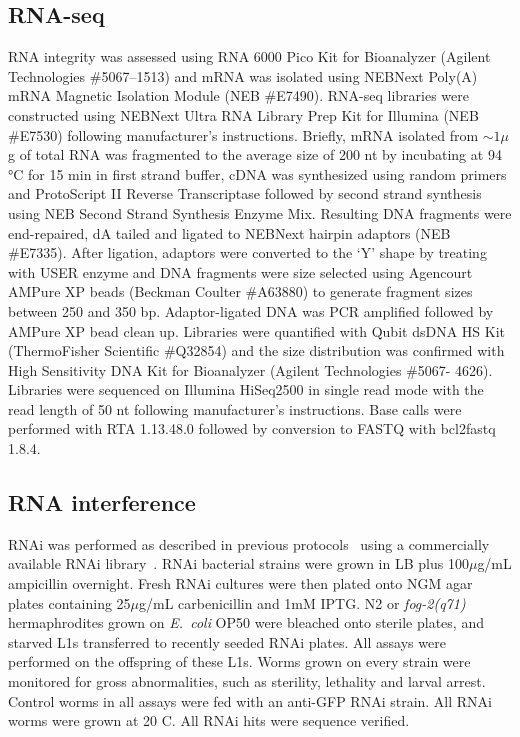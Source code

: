 \documentclass[9pt,twocolumn,twoside]{gsag3jnl}
\newcommand{\fog}{\emph{fog-2}}
\newcommand{\ecol}{\emph{E.~coli}}
\begin{document}
\subsection{RNA-seq}
\label{sb:rna_seq}

RNA integrity was assessed using RNA 6000 Pico Kit for Bioanalyzer (Agilent Technologies \#5067--1513) and mRNA was isolated using NEBNext Poly(A) mRNA Magnetic Isolation Module (NEB \#E7490). RNA-seq libraries were constructed using NEBNext Ultra RNA Library Prep Kit for Illumina (NEB \#E7530) following manufacturer’s instructions. Briefly, mRNA isolated from $\sim1\mu$g of total RNA was fragmented to the average size of 200 nt by incubating at 94 °C for 15 min in first strand buffer, cDNA was synthesized using random primers and ProtoScript II Reverse Transcriptase followed by second strand synthesis using NEB Second Strand Synthesis Enzyme Mix. Resulting DNA fragments were end-repaired, dA tailed and ligated to NEBNext hairpin adaptors (NEB \#E7335).
After ligation, adaptors were converted to the ‘Y’ shape by treating with USER enzyme and DNA fragments were size selected using Agencourt AMPure XP beads (Beckman Coulter \#A63880) to generate fragment sizes between 250 and 350 bp. Adaptor-ligated DNA was PCR amplified followed by AMPure XP bead clean up. Libraries were quantified with Qubit dsDNA HS Kit (ThermoFisher Scientific \#Q32854) and the size distribution was confirmed with High Sensitivity DNA Kit for Bioanalyzer (Agilent Technologies \#5067- 4626).
Libraries were sequenced on Illumina HiSeq2500 in single read mode with the read length of 50 nt following manufacturer's instructions. Base calls were performed with RTA 1.13.48.0 followed by conversion to FASTQ with bcl2fastq 1.8.4.


\subsection{RNA interference}
\label{sb:rnai}
RNAi was performed as described in previous protocols~\citep{Kamath2001} using a commercially available RNAi library~\citep{Kamath2003}. RNAi bacterial strains were grown in LB plus 100$\mu$g/mL ampicillin overnight. Fresh RNAi cultures were then plated onto NGM agar plates containing 25$\mu$g/mL carbenicillin and 1mM IPTG\@. N2 or \fog{}\emph{(q71)} hermaphrodites grown on \ecol{} OP50 were bleached onto sterile plates, and starved L1s transferred to recently seeded RNAi plates.
All assays were performed on the offspring of these L1s. Worms grown on every strain were monitored for gross abnormalities, such as sterility, lethality and larval arrest. Control worms in all assays were fed with an anti-GFP RNAi strain. All RNAi worms were grown at 20\degree{} C. All RNAi hits were sequence verified.
\end{document}
